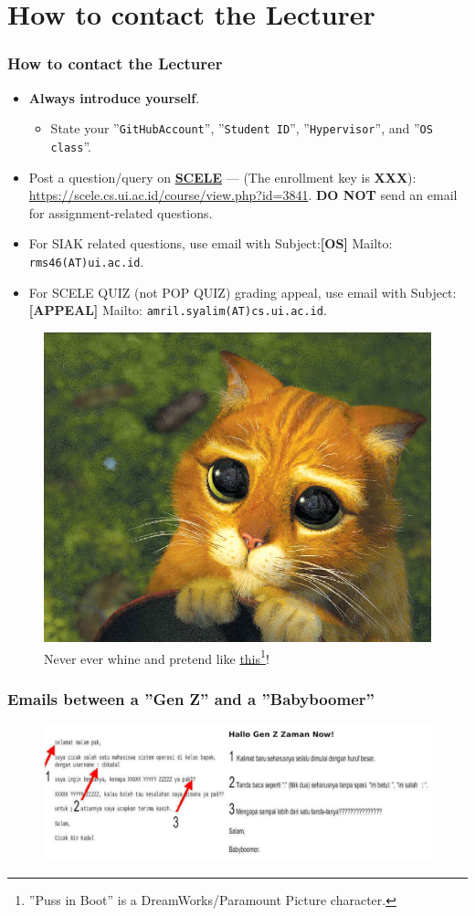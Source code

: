 \documentclass[aspectratio=169, xcolor=table, notheorems, hyperref={pdfpagelabels=false}]{beamer}
\begin{document}
\section{How to contact the Lecturer}
\begin{frame}[fragile]
\frametitle{How to contact the Lecturer}
\begin{itemize}
\item \textbf{Always introduce yourself}.
\begin{itemize}
\item State your ''\texttt{GitHubAccount}'', ''\texttt{Student ID}'', ''\texttt{Hypervisor}'', and ''\texttt{OS class}''.
\end{itemize}
\item Post a question/query on 
\href{https://scele.cs.ui.ac.id/course/view.php?id=3841}{\textbf{SCELE}} ---
(The enrollment key is \textbf{XXX}):
\href{https://scele.cs.ui.ac.id/course/view.php?id=3841}{https://scele.cs.ui.ac.id/course/view.php?id=3841}.
\textbf{DO NOT} send an email for assignment-related questions.
\item For SIAK related questions, use email with
Subject:\textbf{[OS]} Mailto: \texttt{rms46(AT)ui.ac.id}. 
\item For SCELE QUIZ (not POP QUIZ) grading appeal, use email with
Subject:\textbf{[APPEAL]}  Mailto: \texttt{amril.syalim(AT)cs.ui.ac.id}. 
\end{itemize}

\begin{figure}
\includegraphics[width=0.18\linewidth]{os00-pib}
\caption{Never ever whine and pretend like 
         \href{https://rahmatm.samik-ibrahim.vlsm.org/2013/12/puss-in-boots.html}{this}\footnote{''Puss in Boot'' is a DreamWorks/Paramount Picture character.}!}
\end{figure}
\end{frame}

\begin{frame}
\frametitle{Emails between a ''Gen Z'' and a ''Babyboomer''}
\begin{figure}
\includegraphics[width=1.01\linewidth]{os-millenial-mail}
\end{figure}
\end{frame}
\end{document}
